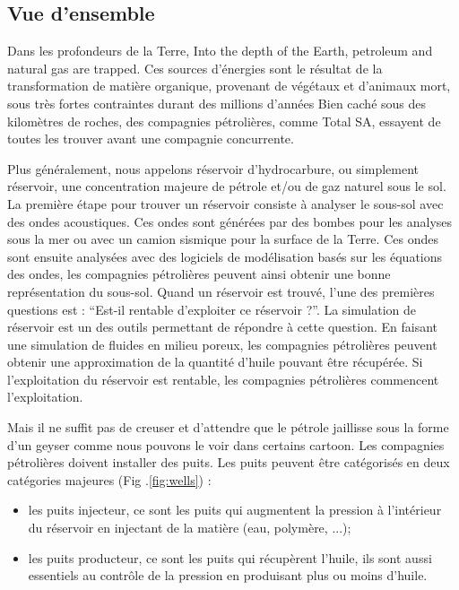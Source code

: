 \subsection{Vue d'ensemble}
Dans les profondeurs de la Terre,
%
Into the depth of the Earth, petroleum and natural gas are trapped.
%
Ces sources d'énergies sont le résultat de la transformation de matière organique, provenant de végétaux et d'animaux mort, sous très fortes contraintes durant des millions d'années
%
Bien caché sous des kilomètres de roches, des compagnies pétrolières, comme Total SA, essayent de toutes les trouver avant une compagnie concurrente.


Plus généralement, nous appelons réservoir d'hydrocarbure, ou simplement réservoir, une concentration majeure de pétrole et/ou de gaz naturel sous le sol.
%
La première étape pour trouver un réservoir consiste à analyser le sous-sol avec des ondes acoustiques.
%
Ces ondes sont générées par des bombes pour les analyses sous la mer ou avec un camion sismique pour la surface de la Terre.
%
Ces ondes sont ensuite analysées avec des logiciels de modélisation basés sur les équations des ondes, les compagnies pétrolières peuvent ainsi obtenir une bonne représentation du sous-sol.
%
Quand un réservoir est trouvé, l'une des premières questions est : ``Est-il rentable d'exploiter ce réservoir ?''.
%
La simulation de réservoir est un des outils permettant de répondre à cette question.
%
En faisant une simulation de fluides en milieu poreux, les compagnies pétrolières peuvent obtenir une approximation de la quantité d'huile pouvant être récupérée.
%
Si l'exploitation du réservoir est rentable, les compagnies pétrolières commencent l'exploitation.


Mais il ne suffit pas de creuser et d'attendre que le pétrole jaillisse sous la forme d'un geyser comme nous pouvons le voir dans certains cartoon.
%
Les compagnies pétrolières doivent installer des puits.
%
Les puits peuvent être catégorisés en deux catégories majeures (Fig .\ref{fig:wells}) :
%
\begin{itemize}
  \item les puits injecteur, ce sont les puits qui augmentent la pression à l'intérieur du réservoir en injectant de la matière (eau, polymère, ...);
  \item les puits producteur, ce sont les puits qui récupèrent l'huile, ils sont aussi essentiels au contrôle de la pression en produisant plus ou moins d'huile.
\end{itemize}

